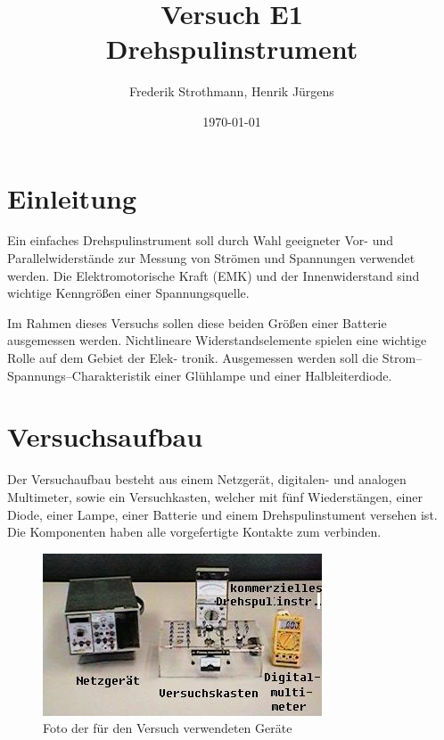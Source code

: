 \documentclass[12pt]{scrartcl}
\title{Versuch E1\\ Drehspulinstrument}
\author{Frederik Strothmann, Henrik Jürgens}
\date{\today}
\begin{document}

\maketitle
\tableofcontents
\newpage



\section{Einleitung}

Ein einfaches Drehspulinstrument soll durch Wahl geeigneter Vor- und Parallelwiderstände
zur Messung von Strömen und Spannungen verwendet werden.
Die Elektromotorische Kraft (EMK) und der Innenwiderstand sind wichtige Kenngrößen einer Spannungsquelle.

Im Rahmen dieses Versuchs sollen diese beiden Größen einer Batterie ausgemessen werden.
Nichtlineare Widerstandselemente spielen eine wichtige Rolle auf dem Gebiet der Elek-
tronik. Ausgemessen werden soll die Strom–Spannungs–Charakteristik einer Glühlampe
und einer Halbleiterdiode.

\section{Versuchsaufbau}
Der Versuchaufbau besteht aus einem Netzgerät, digitalen- und analogen Multimeter, sowie ein Versuchkasten, welcher mit fünf Wiederstängen, einer Diode, einer Lampe, einer Batterie und einem Drehspulinstument versehen ist. Die Komponenten haben alle vorgefertigte Kontakte zum verbinden.


\begin{figure}[htbp] 
  \centering
    \includegraphics[scale = 0.5]{versuchsaufbau.JPG}
  	\caption[Foto der für den Versuch verwendeten Geräte]{Foto der für den Versuch verwendeten Geräte\footnotemark}
  \label{fig:versuchsaufbau}
\end{figure}
\end{document}
